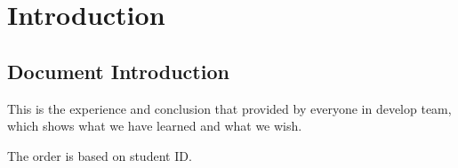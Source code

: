 
\section{Introduction}
\label{sec:intro}
\subsection{Document Introduction}
\label{sec:introduction}
  This is the experience and conclusion that provided by everyone in develop team,
  which shows what we have learned and what we wish.

  The order is based on student ID.
